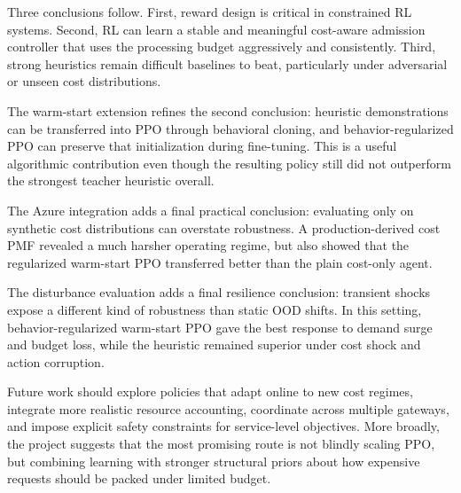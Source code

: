 \documentclass[conference]{IEEEtran}
\begin{document}
Three conclusions follow. First, reward design is critical in constrained RL systems. Second, RL can learn a stable and meaningful cost-aware admission controller that uses the processing budget aggressively and consistently. Third, strong heuristics remain difficult baselines to beat, particularly under adversarial or unseen cost distributions.

The warm-start extension refines the second conclusion: heuristic demonstrations can be transferred into PPO through behavioral cloning, and behavior-regularized PPO can preserve that initialization during fine-tuning. This is a useful algorithmic contribution even though the resulting policy still did not outperform the strongest teacher heuristic overall.

The Azure integration adds a final practical conclusion: evaluating only on synthetic cost distributions can overstate robustness. A production-derived cost PMF revealed a much harsher operating regime, but also showed that the regularized warm-start PPO transferred better than the plain cost-only agent.

The disturbance evaluation adds a final resilience conclusion: transient shocks expose a different kind of robustness than static OOD shifts. In this setting, behavior-regularized warm-start PPO gave the best response to demand surge and budget loss, while the heuristic remained superior under cost shock and action corruption.

Future work should explore policies that adapt online to new cost regimes, integrate more realistic resource accounting, coordinate across multiple gateways, and impose explicit safety constraints for service-level objectives. More broadly, the project suggests that the most promising route is not blindly scaling PPO, but combining learning with stronger structural priors about how expensive requests should be packed under limited budget.
\end{document}
